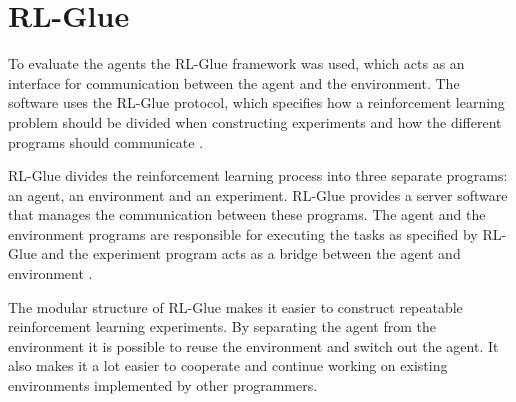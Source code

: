 \section{RL-Glue}
\label{sec:rl_glue}

To evaluate the agents the RL-Glue framework was used, which acts as an
interface for communication between the agent and the environment. The software
uses the RL-Glue protocol, which specifies how a reinforcement learning problem
should be divided when constructing experiments and how the different programs
should communicate \parencite{tanner2009rl}.

RL-Glue divides the reinforcement learning process into three separate
programs: an agent, an environment and an experiment. RL-Glue provides a server
software that manages the communication between these programs. The agent and
the environment programs are responsible for executing the tasks as specified
by RL-Glue and the experiment program acts as a bridge between the agent and
environment \parencite{tanner2009rl}.

The modular structure of RL-Glue makes it easier to construct repeatable
reinforcement learning experiments. By separating the agent from the
environment it is possible to reuse the environment and switch out the agent.
It also makes it a lot easier to cooperate and continue working on existing
environments implemented by other programmers.
